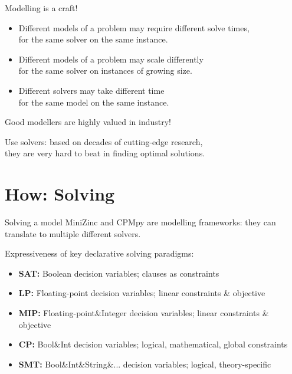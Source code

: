 \documentclass{cons-beamer}
\begin{document}
\begin{frame}{Modelling is a craft!}
  \begin{itemize}
    \item Different models of a problem may require different solve times, \\ 
          for the same solver on the same instance. \vfill
    \item Different models of a problem may scale differently \\ 
          for the same solver on instances of growing size. \vfill
    \item Different solvers may take different time \\
          for the same model on the same instance. \vfill
  \end{itemize}

  \alert{Good modellers are highly valued in industry!} \vfill

  Use solvers: based on decades of cutting-edge research, \\
  they are very hard to beat in finding optimal solutions.
\end{frame}


\section{How: Solving}

\begin{frame}{Solving a model}
  MiniZinc and CPMpy are  modelling frameworks: they can translate to multiple different solvers. \vfill

  Expressiveness of key declarative solving paradigms:
  \begin{itemize}
    \item \textbf{SAT:} Boolean decision variables; clauses as constraints
    \item \textbf{LP:} Floating-point decision variables; linear constraints \& objective
    \item \textbf{MIP:} Floating-point\&Integer decision variables; linear constraints \& objective
    \item \textbf{CP:} Bool\&Int decision variables; logical, mathematical, global constraints
    \item \textbf{SMT:} Bool\&Int\&String\&... decision variables; logical, theory-specific
  \end{itemize}
\end{frame}
\end{document}
